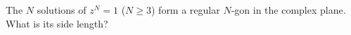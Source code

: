 The $N$ solutions of $z^N=1$ ($N\ge3$) form a regular $N$-gon in the complex plane. What is its side length?

